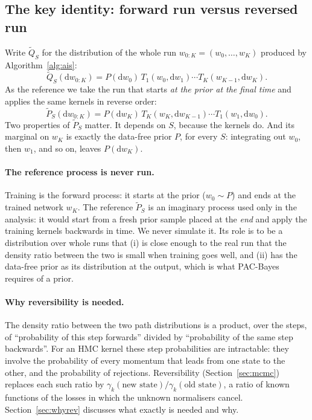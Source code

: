 \documentclass[11pt]{article}
\theoremstyle{definition}
\theoremstyle{remark}
\newcommand{\Qt}{\widetilde{Q}}
\newcommand{\Pt}{\widetilde{P}}
\newcommand{\dd}{\mathrm{d}}
\begin{document}
\subsection{The key identity: forward run versus reversed run}
Write $\Qt_S$ for the distribution of the whole run $w_{0:K}=(w_0,\dots,w_K)$ produced by Algorithm~\ref{alg:ais}:
\[
\Qt_S(\dd w_{0:K})=P(\dd w_0)\,T_1(w_0,\dd w_1)\cdots T_K(w_{K-1},\dd w_K).
\]
As the reference we take the run that starts \emph{at the prior at the final time} and applies the same kernels in
reverse order:
\[
\Pt_S(\dd w_{0:K})=P(\dd w_K)\,T_K(w_K,\dd w_{K-1})\cdots T_1(w_1,\dd w_0).
\]
Two properties of $\Pt_S$ matter. It depends on $S$, because the kernels do. And its marginal on $w_K$ is exactly the
data-free prior $P$, for every $S$: integrating out $w_0$, then $w_1$, and so on, leaves $P(\dd w_K)$.

\paragraph{The reference process is never run.} Training is the forward process: it starts at the prior ($w_0\sim P$) and
ends at the trained network $w_K$. The reference $\Pt_S$ is an imaginary process used only in the analysis: it would start
from a fresh prior sample placed at the \emph{end} and apply the training kernels backwards in time. We never simulate it.
Its role is to be a distribution over whole runs that (i) is close enough to the real run that the density ratio between
the two is small when training goes well, and (ii) has the data-free prior as its distribution at the output, which is
what PAC-Bayes requires of a prior.

\paragraph{Why reversibility is needed.} The density ratio between the two path distributions is a product, over the
steps, of ``probability of this step forwards'' divided by ``probability of the same step backwards''. For an HMC kernel
these step probabilities are intractable: they involve the probability of every momentum that leads from one state to the
other, and the probability of rejections. Reversibility (Section~\ref{sec:mcmc}) replaces each such ratio by
$\gamma_k(\text{new state})/\gamma_k(\text{old state})$, a ratio of known functions of the losses in which the unknown
normalisers cancel. Section~\ref{sec:whyrev} discusses what exactly is needed and why.
\end{document}
